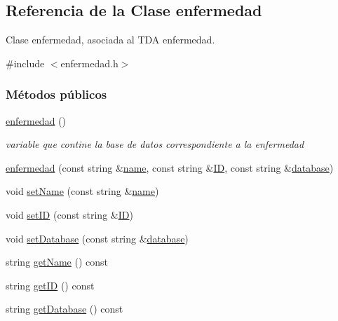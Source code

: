 \hypertarget{classenfermedad}{}\subsection{Referencia de la Clase enfermedad}
\label{classenfermedad}


Clase enfermedad, asociada al T\+DA enfermedad.  




{\ttfamily \#include $<$enfermedad.\+h$>$}

\subsubsection*{Métodos públicos}
\begin{DoxyCompactItemize}
\item 
\hyperlink{classenfermedad_a60eb5e620b0bf9a53d4f0980031aeefd}{enfermedad} ()
\begin{DoxyCompactList}\small\item\em variable que contine la base de datos correspondiente a la enfermedad \end{DoxyCompactList}\item 
\hyperlink{classenfermedad_a7caef55b00a31ce18191ceaba81ed20c}{enfermedad} (const string \&\hyperlink{classenfermedad_ad7c4204057028a73bde6022678c6813e}{name}, const string \&\hyperlink{classenfermedad_a689cdbd469ecc28e045bda2f62a229d2}{ID}, const string \&\hyperlink{classenfermedad_a3684b7ec850d4c9357dd21bdd5e02803}{database})
\item 
void \hyperlink{classenfermedad_a18f621d13de01c0b06a05757ddd8a087}{set\+Name} (const string \&\hyperlink{classenfermedad_ad7c4204057028a73bde6022678c6813e}{name})
\item 
void \hyperlink{classenfermedad_a5ad52bdce8de9ac4fe25b460dc699af4}{set\+ID} (const string \&\hyperlink{classenfermedad_a689cdbd469ecc28e045bda2f62a229d2}{ID})
\item 
void \hyperlink{classenfermedad_ac1f009307d52232420a72264e9c2ce3f}{set\+Database} (const string \&\hyperlink{classenfermedad_a3684b7ec850d4c9357dd21bdd5e02803}{database})
\item 
string \hyperlink{classenfermedad_ab22f6f0140a5fe5a331d72920d95f55b}{get\+Name} () const 
\item 
string \hyperlink{classenfermedad_aaf9b9135b1d4efda7dc61856fce1b7b2}{get\+ID} () const 
\item 
string \hyperlink{classenfermedad_a79d304a2e39ea391917744fd4d8f168d}{get\+Database} () const 

\end{DoxyCompactItemize}
